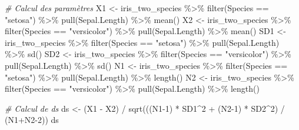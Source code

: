 \documentclass[
]{book}
\newenvironment{Shaded}{\begin{snugshade}}{\end{snugshade}}
\newcommand{\CommentTok}[1]{\textcolor[rgb]{0.56,0.35,0.01}{\textit{#1}}}
\newcommand{\DecValTok}[1]{\textcolor[rgb]{0.00,0.00,0.81}{#1}}
\newcommand{\FunctionTok}[1]{\textcolor[rgb]{0.00,0.00,0.00}{#1}}
\newcommand{\NormalTok}[1]{#1}
\newcommand{\OtherTok}[1]{\textcolor[rgb]{0.56,0.35,0.01}{#1}}
\newcommand{\SpecialCharTok}[1]{\textcolor[rgb]{0.00,0.00,0.00}{#1}}
\newcommand{\StringTok}[1]{\textcolor[rgb]{0.31,0.60,0.02}{#1}}
\begin{document}
\begin{Shaded}
\begin{Highlighting}[]
\CommentTok{\# Calcul des paramètres}
\NormalTok{X1 }\OtherTok{\textless{}{-}}\NormalTok{ iris\_two\_species }\SpecialCharTok{\%\textgreater{}\%} \FunctionTok{filter}\NormalTok{(Species }\SpecialCharTok{==} \StringTok{"setosa"}\NormalTok{) }\SpecialCharTok{\%\textgreater{}\%} \FunctionTok{pull}\NormalTok{(Sepal.Length) }\SpecialCharTok{\%\textgreater{}\%} \FunctionTok{mean}\NormalTok{()}
\NormalTok{X2 }\OtherTok{\textless{}{-}}\NormalTok{ iris\_two\_species }\SpecialCharTok{\%\textgreater{}\%} \FunctionTok{filter}\NormalTok{(Species }\SpecialCharTok{==} \StringTok{"versicolor"}\NormalTok{) }\SpecialCharTok{\%\textgreater{}\%} \FunctionTok{pull}\NormalTok{(Sepal.Length) }\SpecialCharTok{\%\textgreater{}\%} \FunctionTok{mean}\NormalTok{()}
\NormalTok{SD1 }\OtherTok{\textless{}{-}}\NormalTok{ iris\_two\_species }\SpecialCharTok{\%\textgreater{}\%} \FunctionTok{filter}\NormalTok{(Species }\SpecialCharTok{==} \StringTok{"setosa"}\NormalTok{) }\SpecialCharTok{\%\textgreater{}\%} \FunctionTok{pull}\NormalTok{(Sepal.Length) }\SpecialCharTok{\%\textgreater{}\%} \FunctionTok{sd}\NormalTok{()}
\NormalTok{SD2 }\OtherTok{\textless{}{-}}\NormalTok{ iris\_two\_species }\SpecialCharTok{\%\textgreater{}\%} \FunctionTok{filter}\NormalTok{(Species }\SpecialCharTok{==} \StringTok{"versicolor"}\NormalTok{) }\SpecialCharTok{\%\textgreater{}\%} \FunctionTok{pull}\NormalTok{(Sepal.Length) }\SpecialCharTok{\%\textgreater{}\%} \FunctionTok{sd}\NormalTok{()}
\NormalTok{N1 }\OtherTok{\textless{}{-}}\NormalTok{ iris\_two\_species }\SpecialCharTok{\%\textgreater{}\%} \FunctionTok{filter}\NormalTok{(Species }\SpecialCharTok{==} \StringTok{"setosa"}\NormalTok{) }\SpecialCharTok{\%\textgreater{}\%} \FunctionTok{pull}\NormalTok{(Sepal.Length) }\SpecialCharTok{\%\textgreater{}\%} \FunctionTok{length}\NormalTok{()}
\NormalTok{N2 }\OtherTok{\textless{}{-}}\NormalTok{ iris\_two\_species }\SpecialCharTok{\%\textgreater{}\%} \FunctionTok{filter}\NormalTok{(Species }\SpecialCharTok{==} \StringTok{"versicolor"}\NormalTok{) }\SpecialCharTok{\%\textgreater{}\%} \FunctionTok{pull}\NormalTok{(Sepal.Length) }\SpecialCharTok{\%\textgreater{}\%} \FunctionTok{length}\NormalTok{()}

\CommentTok{\# Calcul de ds}
\NormalTok{ds }\OtherTok{\textless{}{-}}\NormalTok{ (X1 }\SpecialCharTok{{-}}\NormalTok{ X2) }\SpecialCharTok{/} \FunctionTok{sqrt}\NormalTok{(((N1}\DecValTok{{-}1}\NormalTok{) }\SpecialCharTok{*}\NormalTok{ SD1}\SpecialCharTok{\^{}}\DecValTok{2} \SpecialCharTok{+}\NormalTok{ (N2}\DecValTok{{-}1}\NormalTok{) }\SpecialCharTok{*}\NormalTok{ SD2}\SpecialCharTok{\^{}}\DecValTok{2}\NormalTok{) }\SpecialCharTok{/}\NormalTok{ (N1}\SpecialCharTok{+}\NormalTok{N2}\DecValTok{{-}2}\NormalTok{))}
\NormalTok{ds}
\end{Highlighting}
\end{Shaded}
\end{document}
